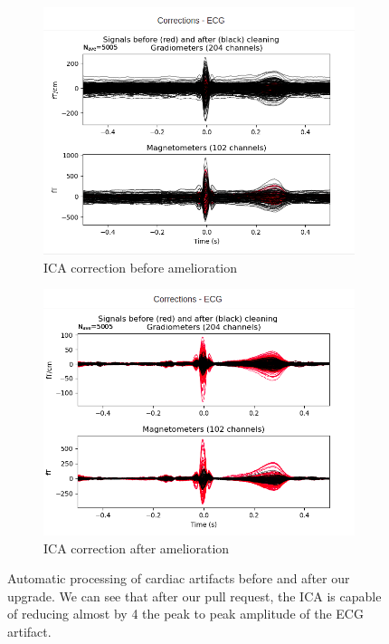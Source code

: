 \begin{figure}
    \centering
    \begin{subfigure}{.5\textwidth}
        \centering
        \includegraphics[width=1.\linewidth]{images_report/preprocessing/ica/ECG_ICA_before_PR.png}
        \caption{ICA correction before amelioration}
        \label{fig:before_ica_PR}
    \end{subfigure}%
    \begin{subfigure}{.5\textwidth}
        \centering
        \includegraphics[width=1.\linewidth]{images_report/preprocessing/ica/ECG_ICA_after_PR.png}
        \caption{ICA correction after amelioration}
        \label{fig:after_ica_PR}
    \end{subfigure}
    \caption[Automatic processing of cardiac artifacts before and after our upgrade.]%
    {Automatic processing of cardiac artifacts before and after our upgrade. We can see that after our pull request, the ICA is capable of reducing almost by 4 the peak to peak amplitude of the ECG artifact.}
    \label{fig:PR_ica}
\end{figure}


